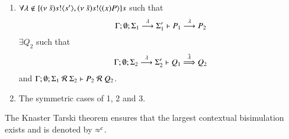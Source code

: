 \begin{definition}
\begin{enumerate}
		\item	$\forall \lambda \notin \{(\nu\ \tilde{s}) s ! \langle s' \rangle, (\nu\ \tilde{s}) s ! \langle (x)P \rangle\}s$ such that
			\[
				\Gamma; \emptyset; \Sigma_1 \stackrel{\lambda}{\longrightarrow} \Sigma_1' \vdash P_1 \stackrel{\lambda}{\longrightarrow} P_2
			\]
			$\exists Q_2$ such that 
			\[
				\Gamma; \emptyset; \Sigma_2 \stackrel{\lambda}{\longrightarrow} \Sigma_2' \vdash Q_1 \stackrel{\hat{\lambda}}{\Longrightarrow} Q_2
			\]
			and
			$\Gamma; \emptyset; \Sigma_1\ \mathcal{R}\ \Sigma_2 \proves P_2\ \mathcal{R}\ Q_2$.

		\item	The symmetric cases of 1, 2 and 3.
	\end{enumerate}
	The Knaster Tarski theorem ensures that the largest contextual bisimulation exists and is denoted by $\approx^c$.
\end{definition}


